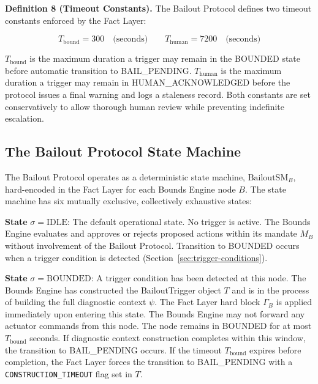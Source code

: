 \documentclass[12pt]{article}
\begin{document}
\bigskip

\noindent\textbf{Definition 8 (Timeout Constants).} The Bailout Protocol defines two timeout constants enforced by the Fact Layer:

\begin{equation}
T_{\text{bound}} = 300 \quad \text{(seconds)} \qquad T_{\text{human}} = 7200 \quad \text{(seconds)}
\end{equation}

$T_{\text{bound}}$ is the maximum duration a trigger may remain in the BOUNDED state before automatic transition to BAIL\_PENDING. $T_{\text{human}}$ is the maximum duration a trigger may remain in HUMAN\_ACKNOWLEDGED before the protocol issues a final warning and logs a staleness record. Both constants are set conservatively to allow thorough human review while preventing indefinite escalation.

\subsection{The Bailout Protocol State Machine}
\label{sec:bp-state-machine}

The Bailout Protocol operates as a deterministic state machine, $\text{BailoutSM}_B$, hard-encoded in the Fact Layer for each Bounds Engine node $B$. The state machine has six mutually exclusive, collectively exhaustive states:

\bigskip

\noindent\textbf{State} $\sigma = \text{IDLE}$: The default operational state. No trigger is active. The Bounds Engine evaluates and approves or rejects proposed actions within its mandate $M_B$ without involvement of the Bailout Protocol. Transition to BOUNDED occurs when a trigger condition is detected (Section~\ref{sec:trigger-conditions}).

\bigskip

\noindent\textbf{State} $\sigma = \text{BOUNDED}$: A trigger condition has been detected at this node. The Bounds Engine has constructed the BailoutTrigger object $T$ and is in the process of building the full diagnostic context $\psi$. The Fact Layer hard block $\Gamma_B$ is applied immediately upon entering this state. The Bounds Engine may not forward any actuator commands from this node. The node remains in BOUNDED for at most $T_{\text{bound}}$ seconds. If diagnostic context construction completes within this window, the transition to BAIL\_PENDING occurs. If the timeout $T_{\text{bound}}$ expires before completion, the Fact Layer forces the transition to BAIL\_PENDING with a \texttt{CONSTRUCTION\_TIMEOUT} flag set in $T$.
\end{document}
